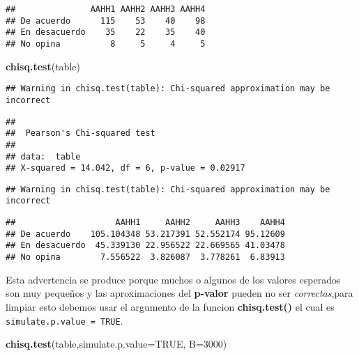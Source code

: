 \documentclass[
]{article}
\newenvironment{Shaded}{\begin{snugshade}}{\end{snugshade}}
\newcommand{\DataTypeTok}[1]{\textcolor[rgb]{0.13,0.29,0.53}{#1}}
\newcommand{\DecValTok}[1]{\textcolor[rgb]{0.00,0.00,0.81}{#1}}
\newcommand{\KeywordTok}[1]{\textcolor[rgb]{0.13,0.29,0.53}{\textbf{#1}}}
\newcommand{\NormalTok}[1]{#1}
\newcommand{\OperatorTok}[1]{\textcolor[rgb]{0.81,0.36,0.00}{\textbf{#1}}}
\newcommand{\OtherTok}[1]{\textcolor[rgb]{0.56,0.35,0.01}{#1}}
\begin{document}
\begin{verbatim}
##               AAHH1 AAHH2 AAHH3 AAHH4
## De acuerdo      115    53    40    98
## En desacuerdo    35    22    35    40
## No opina          8     5     4     5
\end{verbatim}

\begin{Shaded}
\begin{Highlighting}[]
\KeywordTok{chisq.test}\NormalTok{(table)}
\end{Highlighting}
\end{Shaded}

\begin{verbatim}
## Warning in chisq.test(table): Chi-squared approximation may be incorrect
\end{verbatim}

\begin{verbatim}
## 
##  Pearson's Chi-squared test
## 
## data:  table
## X-squared = 14.042, df = 6, p-value = 0.02917
\end{verbatim}

\begin{Shaded}
\end{Shaded}

\begin{verbatim}
## Warning in chisq.test(table): Chi-squared approximation may be incorrect
\end{verbatim}

\begin{verbatim}
##                    AAHH1     AAHH2     AAHH3    AAHH4
## De acuerdo    105.104348 53.217391 52.552174 95.12609
## En desacuerdo  45.339130 22.956522 22.669565 41.03478
## No opina        7.556522  3.826087  3.778261  6.83913
\end{verbatim}

Esta advertencia se produce porque muchos o algunos de los valores
esperados son muy pequeños y las aproximaciones del \textbf{p-valor}
pueden no ser \emph{correctas},para limpiar esto debemos usar el
argumento de la funcion \textbf{chisq.test()} el cual es
\texttt{simulate.p.value\ =\ TRUE}.

\begin{Shaded}
\begin{Highlighting}[]
\KeywordTok{chisq.test}\NormalTok{(table,}\DataTypeTok{simulate.p.value=}\OtherTok{TRUE}\NormalTok{, }\DataTypeTok{B=}\DecValTok{3000}\NormalTok{)}
\end{Highlighting}
\end{Shaded}
\end{document}
